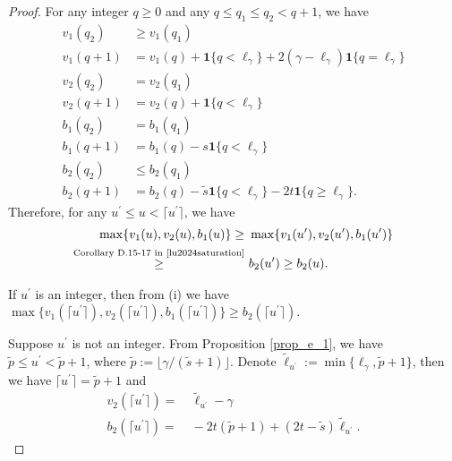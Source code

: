 \documentclass{article}
\theoremstyle{plain}
\theoremstyle{definition}
\theoremstyle{remark}
\begin{document}
\begin{appendix}
\begin{proof}
For any integer $q \geq 0$ and any $q \leq q_1 \leq q_2 < q+1$, we have
\begin{equation}\label{eqn_prop_e3_1}
    \begin{aligned}
        v_1(q_2) &\geq v_1(q_1)\\
        v_1(q+1) &= v_1(q) + \mathbf{1}\{q < \ell_{\gamma}\} + 2(\gamma -\ell_{\gamma})\mathbf{1}\{q = \ell_{\gamma}\}\\
        v_2(q_2) &= v_2(q_1)\\
        v_2(q+1) &= v_2(q) + \mathbf{1}\{q < \ell_{\gamma}\}\\
        b_1(q_2) &= b_1(q_1)\\
        b_1(q+1) &= b_1(q) - s\mathbf{1}\{q < \ell_{\gamma}\}\\
        b_2(q_2) &\leq b_2(q_1)\\
        b_2(q+1) &= b_2(q) - \tilde{s}\mathbf{1}\{q < \ell_{\gamma}\} - 2t \mathbf{1}\{q \geq \ell_{\gamma}\}.
    \end{aligned}
\end{equation}
Therefore, for any $u^{\prime} \leq u < \lceil u^{\prime} \rceil$, we have
     \begin{align*}
         \max\{v_1(u), v_2(u), b_1(u)\} 
         \geq&~
         \max\{v_1(u^{\prime}), v_2(u^{\prime}), b_1(u^{\prime})\}\\
         \overset{\text{Corollary D.15-17 in \cite{lu2024saturation}} }{\geq}&~
         b_2(u^{\prime}) \geq b_2(u).
     \end{align*}






 

If $u^{\prime}$ is an integer, then from (i) we have $\max\{v_1(\lceil u^{\prime} \rceil), v_2(\lceil u^{\prime} \rceil), b_1(\lceil u^{\prime} \rceil)\} \geq b_2(\lceil u^{\prime} \rceil)$. 

Suppose $u^{\prime}$ is not an integer. 
From Proposition \ref{prop_e_1}, we have $\tilde{p} \leq u^{\prime} < \tilde{p}+1$, where $\tilde{p}:=\lfloor \gamma/(\tilde{s}+1)\rfloor$.
Denote $\tilde{\ell}_{u^{\prime}} := \min\{\ell_{\gamma}, \tilde{p}+1\}$, then we have $\lceil u^{\prime} \rceil = \tilde{p}+1$ and
\begin{equation*}
    \begin{aligned}
    v_2(\lceil u^{\prime} \rceil) =&~  \tilde{\ell}_{u^{\prime}} - \gamma\\
    b_2(\lceil u^{\prime} \rceil) =&~ -2  t  (\tilde{p}+1) + (2  t - \tilde{s})  \tilde{\ell}_{u^{\prime}}.
    \end{aligned}
\end{equation*}


\end{proof}
\end{appendix}
\end{document}
